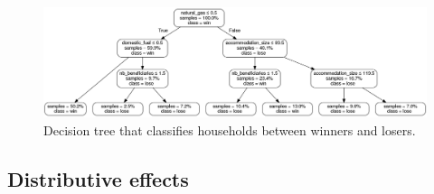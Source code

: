 \documentclass[12pt]{article} %
\begin{document}
\begin{appendices}


\begin{figure}[H]
\centering
\includegraphics[width=\columnwidth]{Images/decision_tree_wo_values_wo_color.png}
\caption{Decision tree that classifies households between winners and losers.}
\label{fig:tree}
\end{figure}


\subsection{Distributive effects \label{subsec:app_distributive}}


\end{appendices}
\end{document}
